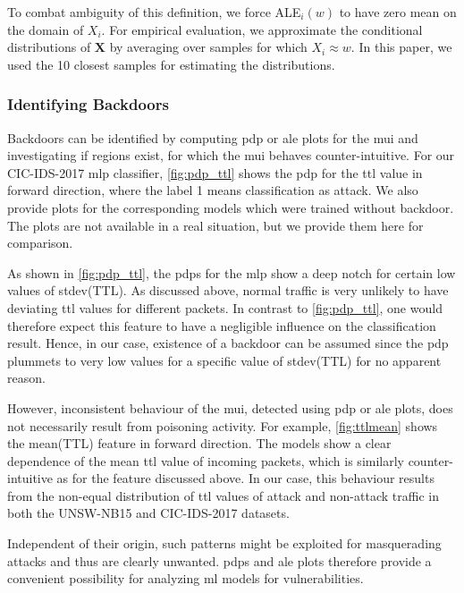 \documentclass[9pt,sigconf,letterpaper,dvipsnames\ifx\removeHeaders\tempYes ,nonacm\fi]{acmart}
\newcommand{\unsw}{UNSW-NB15}
\newcommand{\cic}{CIC-IDS-2017}
\begin{document}
To combat ambiguity of this definition, we force ALE$_i(w)$ to have zero mean on the domain of $X_i$.
For empirical evaluation, we approximate the conditional distributions of $\boldsymbol X$ by averaging over samples for which $X_i \approx w$. In this paper, we used the 10  closest samples
for estimating the distributions.

\subsubsection{Identifying Backdoors}

Backdoors can be identified by computing \gls{pdp} or \gls{ale} plots for the \gls{mui} and investigating if regions exist, for which the \gls{mui} behaves counter-intuitive. For our \cic{} \gls{mlp} classifier, \autoref{fig:pdp_ttl} shows the \gls{pdp} for the \gls{ttl} value in forward direction, where the label 1 means classification as attack. We also provide plots for the corresponding models which were trained without backdoor. The plots are not available in a real situation, but we provide them here for comparison.

As shown in \autoref{fig:pdp_ttl}, the \glspl{pdp} for the \gls{mlp} show a deep notch for certain low values of stdev(TTL). As discussed above, normal traffic is very unlikely to have deviating \gls{ttl} values for different packets. In contrast to \autoref{fig:pdp_ttl}, one would therefore expect this feature to have a negligible influence on the classification result. Hence, in our case,
existence of a backdoor can be assumed since the \gls{pdp} plummets to very low values for a specific value of stdev(TTL) for no apparent reason.


However, inconsistent behaviour of the \gls{mui}, detected using \gls{pdp} or \gls{ale} plots, does not necessarily result from poisoning activity.  For example, \autoref{fig:ttlmean} shows the mean(TTL) feature in forward direction. The models show a clear dependence of the mean \gls{ttl} value of incoming packets, which is similarly counter-intuitive as for the feature discussed above. In our case, this behaviour results from the non-equal distribution of \gls{ttl} values of attack and non-attack traffic in both the \unsw{} and \cic{} datasets.


Independent of their origin, such patterns might be exploited for masquerading attacks and thus are clearly unwanted.
\glspl{pdp} and \gls{ale} plots therefore provide a convenient possibility for analyzing \gls{ml} models for vulnerabilities. %
\end{document}
